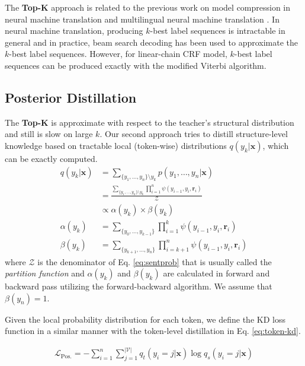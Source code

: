 \documentclass[11pt,a4paper]{article}
\newcommand{\xvec}{\mathbf{x}}
\newcommand{\rvec}{\mathbf{r}}
\newcommand{\mcL}{\mathcal{L}}
\newcommand{\mcZ}{\mathcal{Z}}
\newcommand{\mcV}{\mathcal{V}}
\begin{document}
The \textbf{Top-K} approach is related to the previous work on model compression in neural machine translation \cite{kim-rush-2016-sequence} and multilingual neural machine translation \cite{tan2018multilingual}.
In neural machine translation, producing $k$-best label sequences is intractable in general and in practice, beam search decoding has been used to approximate the $k$-best label sequences. However, for linear-chain CRF model, $k$-best label sequences can be produced exactly with the modified Viterbi algorithm.

\subsection{Posterior Distillation}
\label{sec:posterior}
The \textbf{Top-K} is approximate with respect to the teacher's structural distribution and still is slow on large $k$. Our second approach tries to distill structure-level knowledge based on tractable local (token-wise) distributions $q(y_k|\xvec)$, which can be exactly computed.
\begin{align}
q(y_k|\xvec)&=\sum\limits_{\{y_1,\dots,y_n\}\setminus y_k} p(y_1,\dots,y_n|\xvec) \nonumber\\
&=\frac{\sum\limits_{\{y_1,\dots,y_n\}\setminus y_k} \prod\limits_{i=1}^{n} \psi(y_{i-1}, y_i, \rvec_i)}{\mcZ} \label{eq:posterior}\\
&\propto \alpha(y_k) \times \beta(y_k) \nonumber \\ \alpha(y_k)&=\sum\limits_{\{y_0,\dots,y_{k-1}\}} \prod\limits_{i=1}^{k} \psi(y_{i-1}, y_i, \rvec_i) \label{eq:alpha}\\
\beta(y_k) &= \sum\limits_{\{y_{k+1},\dots,y_n\}} \prod\limits_{i=k+1}^{n} \psi(y_{i-1}, y_i, \rvec_i)\label{eq:beta}
\end{align}
where $\mcZ$ is the denominator of Eq. \ref{eq:sentprob} that is usually called the \textit{partition function} and $\alpha(y_k)$ and $\beta(y_k)$ are calculated in forward and backward pass utilizing the forward-backward algorithm. We assume that $\beta(y_n)=1$.

Given the local probability distribution for each token, we define the KD loss function in a similar manner with the token-level distillation in Eq. \ref{eq:token-kd}. 

\begin{align}
\mcL_{\text{Pos.}} = - \sum\limits_{i=1}^{n} \sum\limits_{j=1}^{|\mcV|} q_t(y_{i}=j|\xvec) \log q_s(y_{i}=j|\xvec) \label{eq:pos-kd}
\end{align}
\end{document}
